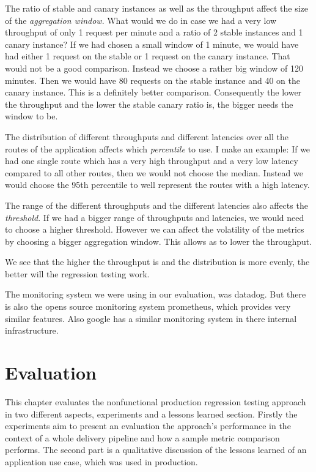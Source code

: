 The ratio of stable and canary instances as well as the throughput affect the size of the
\emph{aggregation window}. What would we do in case we had a very low throughput of only 1
request per minute and a ratio of 2 stable instances and 1 canary instance? If we had
chosen a small window of 1 minute, we would have had either 1 request on the stable or 1
request on the canary instance. That would not be a good comparison. Instead we choose a
rather big window of 120 minutes. Then we would have 80 requests on the stable instance
and 40 on the canary instance. This is a definitely better comparison. Consequently the
lower the throughput and the lower the stable canary ratio is, the bigger needs the window
to be.

The distribution of different throughputs and different latencies over all the routes of
the application affects which \emph{percentile} to use. I make an example: If we had one
single route which has a very high throughput and a very low latency compared to all other
routes, then we would not choose the median. Instead we would choose the 95th percentile
to well represent the routes with a high latency.

The range of the different throughputs and the different latencies also affects the
\emph{threshold}. If we had a bigger range of throughputs and latencies, we would need to
choose a higher threshold. However we can affect the volatility of the metrics by choosing
a bigger aggregation window. This allows as to lower the throughput.

We see that the higher the throughput is and the distribution is more evenly, the better
will the regression testing work.

The monitoring system we were using in our evaluation, was datadog. But there is also the
opens source monitoring system prometheus, which provides very similar features. Also
google has a similar monitoring system in there internal infrastructure.

\chapter{Evaluation}

This chapter evaluates the nonfunctional production regression testing approach in two
different aspects, experiments and a lessons learned section. Firstly the experiments aim
to present an evaluation the approach's performance in the context of a whole delivery
pipeline and how a sample metric comparison performs. The second part is a qualitative
discussion of the lessons learned of an application use case, which was used in
production.

